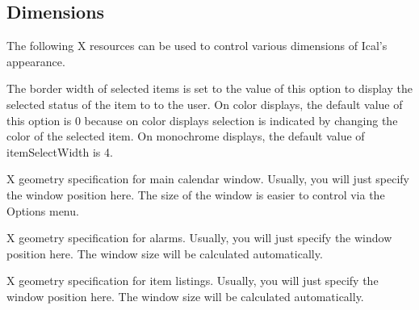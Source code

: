 \documentclass[a4paper,english]{article}
\begin{document}
    \subsection{Dimensions}
        \begin{Description}\setlength{\itemsep}{0cm}
        The following X resources can be used to control various
        dimensions of Ical's appearance.

        \item[Ical.itemSelectWidth]
            The border width of selected items is set to the value of
            this option to display the selected status of the item to
            to the user.  On color displays, the default value of this
            option is 0 because on color displays selection is
            indicated by changing the color of the selected item.  On
            monochrome displays, the default value of itemSelectWidth
            is 4.

        \item[Ical.Dayview.geometry]
            X geometry specification for main calendar window.
            Usually, you will just specify the window position here.
            The size of the window is easier to control via the
            Options menu.

        \item[Ical.Reminder.geometry]
            X geometry specification for alarms.  Usually, you will
            just specify the window position here.  The window size
            will be calculated automatically.

        \item[Ical.Listing.geometry]
            X geometry specification for item listings.  Usually, you
            will just specify the window position here.  The window
            size will be calculated automatically.

        \end{Description}
\end{document}
